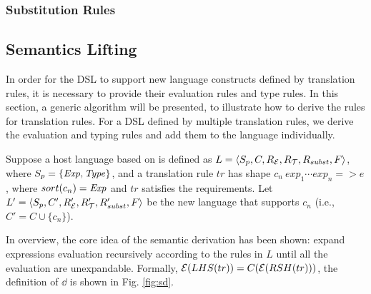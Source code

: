 \subsubsection{Substitution Rules}




\subsection{Semantics Lifting}


In order for the DSL to support new language constructs defined by translation rules, 
 it is necessary to provide their evaluation rules and type rules.
In this section, a generic algorithm will be presented, 
 to illustrate how to derive the rules for translation rules.
For a DSL defined by multiple translation rules, 
 we derive the evaluation and typing rules and add them to the language individually.

Suppose a host language based on \STLC is defined as $L=\langle S_p, C, R_{\mathcal{E}}, R_{\mathcal{T}}, R_{subst}, F\rangle$,
where $S_p=\{\mathit{Exp},\mathit{Type}\}$,
and a translation rule $tr$ has shape $c_n~exp_1\cdots exp_n => e$,
where $sort(c_n)=\mathit{Exp}$ and $tr$ satisfies the requirements.
Let $L'=\langle S_p, C', R'_{\mathcal{E}}, R'_{\mathcal{T}}, R'_{subst}, F\rangle$ be the new language that supports $c_n$ (i.e., $C'=C \cup \{c_n\}$).

In overview, the core idea of the semantic derivation has been shown: 
 expand expressions evaluation recursively according to the rules in $L$ 
 until all the evaluation are unexpandable.
Formally, $\mathcal{E}(LHS(tr))=C(\mathcal{E}(RSH(tr)))$, the definition of $\dd$ is shown in Fig. \ref{fig:sd}.

